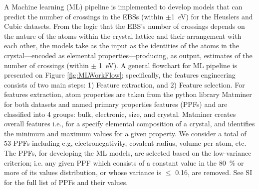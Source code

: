 \documentclass[article]{elsarticle}
\begin{document}
A Machine learning (ML) pipeline is implemented to develop models that can predict the number of crossings in the EBSs (within $\pm$\SI{1}{\electronvolt}) for the Heuslers and Cubic datasets. From the logic that the EBS's number of crossings depends on the nature of the atoms within the crystal lattice and their arrangement with each other, the models take as the input as the identities of the atoms in the crystal---encoded as elemental properties---producing, as output, estimates of the number of crossings (within $\pm$ \SI{1}{\electronvolt}). A general flowchart for ML pipeline is presented on Figure \ref{fig:MLWorkFlow}; specifically, the features engineering consists of two main steps: 1) Feature extraction, and 2) Feature selection. For features extraction, atom properties are taken from the python library Matminer\cite{ward2018matminer,Matminer} for both datasets and named primary properties features (PPFs) and are classified into 4 groups: bulk, electronic, size, and crystal. Matminer creates overall features i.e., for a specify elemental composition of a crystal, and identifies the minimum and maximum values for a given property. We consider a total of 53 PPFs including e.g, electronegativity, covalent radius, volume per atom, etc.  %
The PPFs, for developing the ML models, are selected based on the low-variance criterion; i.e. any given PPF which consists of a constant value in the \SI{80}{\percent} or more of its values distribution, or whose variance is $\mathrm{\leq}$ \num{0.16}, are removed. See SI for the full list of PPFs and their values. %
\end{document}
